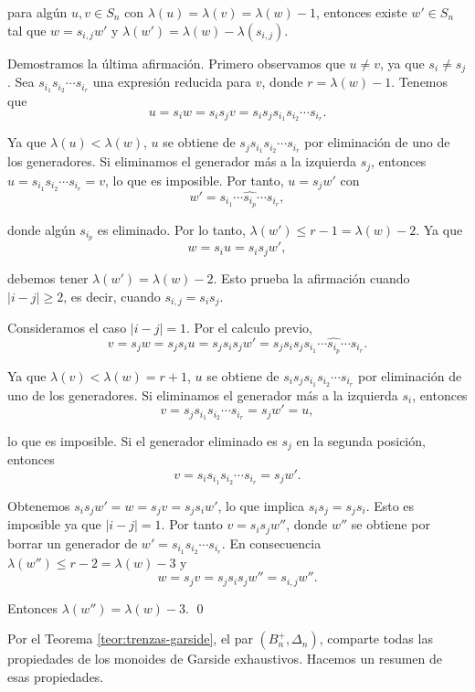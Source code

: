 \documentclass[12pt]{article}
\theoremstyle{definition}
\begin{document}
para algún $u,v\in S_n$ con $\lambda(u)=\lambda(v)=\lambda(w)-1$, entonces existe $w'\in S_n$ tal que $w=s_{i,j}w'$ y $\lambda(w')=\lambda(w)-\lambda(s_{i,j})$.

Demostramos la última afirmación. Primero observamos que $u\neq v$, ya que $s_i\neq s_j$. Sea $s_{i_1}s_{i_2}\cdots s_{i_r}$ una expresión reducida para $v$, donde $r=\lambda(w)-1$. Tenemos que
$$u=s_iw=s_is_jv=s_is_js_{i_1}s_{i_2}\cdots s_{i_r}.$$

Ya que $\lambda(u)<\lambda(w)$, $u$ se obtiene de $s_js_{i_1}s_{i_2}\cdots s_{i_r}$ por eliminación de uno de los generadores. Si eliminamos el generador más a la izquierda $s_j$, entonces $u=s_{i_1}s_{i_2}\cdots s_{i_r}=v$, lo que es imposible. Por tanto, $u=s_jw'$ con
$$w'=s_{i_1}\cdots\widehat{s_{i_p}}\cdots s_{i_r},$$

donde algún $s_{i_p}$ es eliminado. Por lo tanto, $\lambda(w')\leq r-1=\lambda(w)-2$. Ya que
$$w=s_iu=s_is_jw',$$

debemos tener $\lambda(w')=\lambda(w)-2$. Esto prueba la afirmación cuando $|i-j|\geq 2$, es decir, cuando $s_{i,j}=s_is_j$.

Consideramos el caso $|i-j|=1$. Por el calculo previo,
$$v=s_jw=s_js_iu=s_js_is_jw'=s_js_is_js_{i_1}\cdots\widehat{s_{i_p}}\cdots s_{i_r}.$$

Ya que $\lambda(v)<\lambda(w)=r+1$, $u$ se obtiene de $s_is_js_{i_1}s_{i_2}\cdots s_{i_r}$ por eliminación de uno de los generadores. Si eliminamos el generador más a la izquierda $s_i$, entonces
$$v=s_js_{i_1}s_{i_2}\cdots s_{i_r}=s_jw'=u,$$

lo que es imposible. Si el generador eliminado es $s_j$ en la segunda posición, entonces
$$v=s_is_{i_1}s_{i_2}\cdots s_{i_r}=s_jw'.$$

Obtenemos $s_is_jw'=w=s_jv=s_js_iw'$, lo que implica $s_is_j=s_js_i$. Esto es imposible ya que $|i-j|=1$. Por tanto $v=s_is_jw''$, donde $w''$ se obtiene por borrar un generador de $w'=s_{i_1}s_{i_2}\cdots s_{i_r}$. En consecuencia $\lambda(w'')\leq r-2=\lambda(w)-3$ y
$$w=s_jv=s_js_is_jw''=s_{i,j}w''.$$

Entonces $\lambda(w'')=\lambda(w)-3$. \qed
\ 
\newline

Por el Teorema \ref{teor:trenzas-garside}, el par $(B_n^+,\Delta_n)$, comparte todas las propiedades de los monoides de Garside exhaustivos. Hacemos un resumen de esas propiedades.
\end{document}
